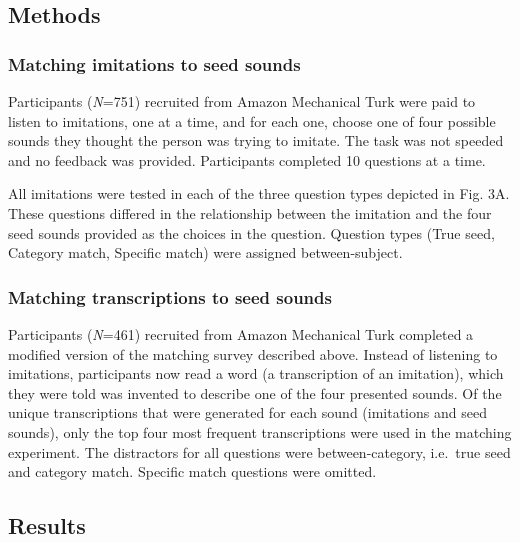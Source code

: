 \documentclass[english,floatsintext,man]{apa6}
\theoremstyle{definition}
\theoremstyle{definition}
\theoremstyle{definition}
\theoremstyle{remark}
\begin{document}
\hypertarget{methods-1}{%
\subsection{Methods}\label{methods-1}}

\hypertarget{matching-imitations-to-seed-sounds}{%
\subsubsection{Matching imitations to seed
sounds}\label{matching-imitations-to-seed-sounds}}

Participants (\emph{N}=751) recruited from Amazon Mechanical Turk were
paid to listen to imitations, one at a time, and for each one, choose
one of four possible sounds they thought the person was trying to
imitate. The task was not speeded and no feedback was provided.
Participants completed 10 questions at a time.

All imitations were tested in each of the three question types depicted
in Fig. 3A. These questions differed in the relationship between the
imitation and the four seed sounds provided as the choices in the
question. Question types (True seed, Category match, Specific match)
were assigned between-subject.

\hypertarget{matching-transcriptions-to-seed-sounds}{%
\subsubsection{Matching transcriptions to seed
sounds}\label{matching-transcriptions-to-seed-sounds}}

Participants (\emph{N}=461) recruited from Amazon Mechanical Turk
completed a modified version of the matching survey described above.
Instead of listening to imitations, participants now read a word (a
transcription of an imitation), which they were told was invented to
describe one of the four presented sounds. Of the unique transcriptions
that were generated for each sound (imitations and seed sounds), only
the top four most frequent transcriptions were used in the matching
experiment. The distractors for all questions were between-category,
i.e.~true seed and category match. Specific match questions were
omitted.

\hypertarget{results-1}{%
\subsection{Results}\label{results-1}}
\end{document}
